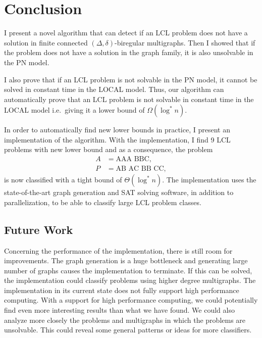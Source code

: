 
\section{Conclusion} \label{sec:conclusion}

I present a novel algorithm that can detect if an LCL problem does not have a solution in finite connected $(\Delta, \delta)$-biregular multigraphs.
Then I showed that if the problem does not have a solution in the graph family, it is also unsolvable in the PN model.

I also prove that if an LCL problem is not solvable in the PN model, it cannot be solved in constant time in the LOCAL model.
Thus, our algorithm can automatically prove that an LCL problem is not solvable in constant time in the LOCAL model i.e.\ giving it a lower bound of $\Omega(\log^* n)$.

In order to automatically find new lower bounds in practice, I present an implementation of the algorithm.
With the implementation, I find 9 LCL problems with new lower bound and as a consequence, the problem
\begin{align*}
    A&=\text{AAA BBC},\\
    P&=\text{AB AC BB CC},
\end{align*}
is now classified with a tight bound of $\Theta(\log^* n)$.
The implementation uses the state-of-the-art graph generation and SAT solving software, in addition to parallelization, to be able to classify large LCL problem classes.

\subsection{Future Work}

Concerning the performance of the implementation, there is still room for improvements.
The graph generation is a huge bottleneck and generating large number of graphs causes the implementation to terminate.
If this can be solved, the implementation could classify problems using higher degree multigraphs.
The implementation in its current state does not fully support high performance computing.
With a support for high performance computing, we could potentially find even more interesting results than what we have found.
We could also analyze more closely the problems and multigraphs in which the problems are unsolvable.
This could reveal some general patterns or ideas for more classifiers.
